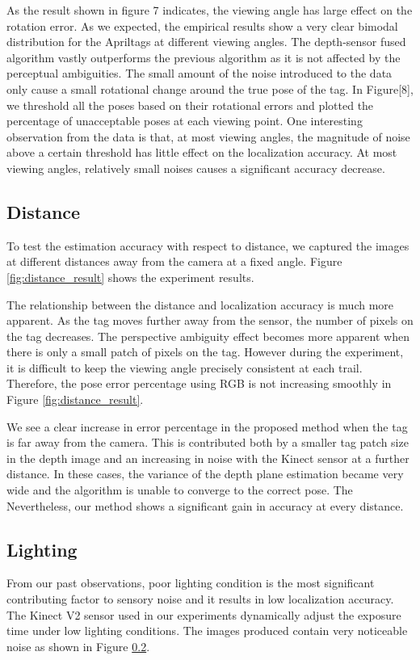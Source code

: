 As the result shown in figure 7 indicates, the viewing angle has large effect on the rotation error. As we expected, the empirical results show a very clear bimodal distribution for the Apriltags at different viewing angles. The depth-sensor fused algorithm vastly outperforms the previous algorithm as it is not affected by the perceptual ambiguities. The small amount of the noise introduced to the data only cause a small rotational change around the true pose of the tag. In Figure[8], we threshold all the poses based on their rotational errors and plotted the percentage of unacceptable poses at each viewing point. One interesting observation from the data is that, at most viewing angles, the magnitude of noise above a certain threshold has little effect on the localization accuracy. At most viewing angles, relatively small noises causes a significant accuracy decrease. 

\subsection{Distance}
To test the estimation accuracy with respect to distance, we captured the images at different distances away from the camera at a fixed angle. Figure \ref{fig:distance_result} shows the experiment results.

The relationship between the distance and localization accuracy is much more apparent. As the tag moves further away from the sensor, the number of pixels on the tag decreases. The perspective ambiguity effect becomes more apparent when there is only a small patch of pixels on the tag. However during the experiment, it is difficult to keep the viewing angle precisely consistent at each trail. Therefore, the pose error percentage using RGB is not increasing smoothly in Figure \ref{fig:distance_result}.

We see a clear increase in error percentage in the proposed method when the tag is far away from the camera. This is contributed both by a smaller tag patch size in the depth image and an increasing in noise with the Kinect sensor at a further distance. In these cases, the variance of the depth plane estimation became very wide and the algorithm is unable to converge to the correct pose. The Nevertheless, our method shows a significant gain in accuracy at every distance.

\subsection{Lighting}
From our past observations, poor lighting condition is the most significant contributing factor to sensory noise and it results in low localization accuracy. The Kinect V2 sensor used in our experiments dynamically adjust the exposure time under low lighting conditions. The images produced contain very noticeable noise as shown in Figure \ref{}.

